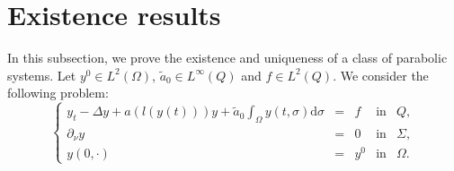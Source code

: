 \documentclass[reqno,twoside]{amsart}
\numberwithin{equation}{section}
\theoremstyle{definition}
\numberwithin{equation}{section}
\def \dis {\displaystyle}
\def \d {\mathrm{d}}
\begin{document}
\section{Existence results}\label{existence}
In this subsection, we prove the existence and uniqueness of a class of parabolic systems. Let $y^0\in L^2(\Omega)$, $\tilde{a}_0\in L^\infty(Q)$ and $f\in L^2(Q)$. We consider the following problem:
\begin{equation}\label{general}
	\left\{
	\begin{array}{rllll}
		\dis y_t-\Delta y+a(l(y(t)))y+\tilde{a}_0\int_{\Omega}y(t,\sigma)\d\sigma &=& f &\mbox{in}& Q,\\
		\dis \partial_{\nu}y&=&0  &\mbox{in}& \Sigma,\\
		y(0,\cdot)&=& y^0 &\mbox{in}& \Omega.
	\end{array}
	\right.
\end{equation}
\end{document}
